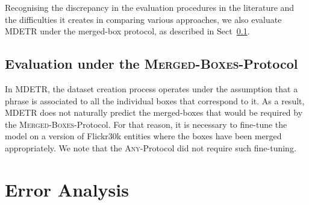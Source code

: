 Recognising the discrepancy in the evaluation procedures in the literature and the difficulties it creates in comparing various approaches, we also evaluate MDETR under the merged-box protocol, as described in Sect~\ref{sec:merged_boxes}.

\subsection{Evaluation under the \textsc{Merged-Boxes}-Protocol}
\label{sec:merged_boxes}
In MDETR, the dataset creation process operates under the assumption that a phrase is associated to all the individual boxes that correspond to it. As a result, MDETR does not naturally predict the merged-boxes that would be required by the \textsc{Merged-Boxes}-Protocol. For that reason, it is necessary to fine-tune the model on a version of Flickr30k entities where the boxes have been merged appropriately. We note that the \textsc{Any}-Protocol did not require such fine-tuning.


\section{Error Analysis}

